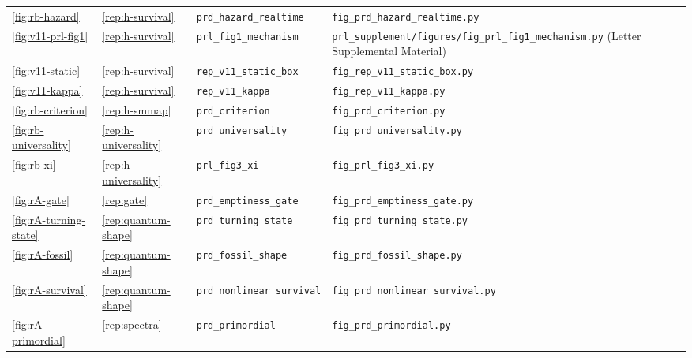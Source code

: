 {\begin{longtable}{@{}>{\raggedright\arraybackslash}p{}>{\raggedright\arraybackslash}p{}>{\raggedright\arraybackslash}p{}>{\raggedright\arraybackslash}p{}@{}}
\ref{fig:rb-hazard} & \ref{rep:h-survival} & \texttt{prd\_\allowbreak{}hazard\_\allowbreak{}realtime} & \texttt{fig\_\allowbreak{}prd\_\allowbreak{}hazard\_\allowbreak{}realtime.py} \\
\ref{fig:v11-prl-fig1} & \ref{rep:h-survival} & \texttt{prl\_\allowbreak{}fig1\_\allowbreak{}mechanism} & \texttt{prl\_\allowbreak{}supplement/\allowbreak{}figures/\allowbreak{}fig\_\allowbreak{}prl\_\allowbreak{}fig1\_\allowbreak{}mechanism.py} (Letter Supplemental Material) \\
\ref{fig:v11-static} & \ref{rep:h-survival} & \texttt{rep\_\allowbreak{}v11\_\allowbreak{}static\_\allowbreak{}box} & \texttt{fig\_\allowbreak{}rep\_\allowbreak{}v11\_\allowbreak{}static\_\allowbreak{}box.py} \\
\ref{fig:v11-kappa} & \ref{rep:h-survival} & \texttt{rep\_\allowbreak{}v11\_\allowbreak{}kappa} & \texttt{fig\_\allowbreak{}rep\_\allowbreak{}v11\_\allowbreak{}kappa.py} \\
\ref{fig:rb-criterion} & \ref{rep:h-smmap} & \texttt{prd\_\allowbreak{}criterion} & \texttt{fig\_\allowbreak{}prd\_\allowbreak{}criterion.py} \\
\ref{fig:rb-universality} & \ref{rep:h-universality} & \texttt{prd\_\allowbreak{}universality} & \texttt{fig\_\allowbreak{}prd\_\allowbreak{}universality.py} \\
\ref{fig:rb-xi} & \ref{rep:h-universality} & \texttt{prl\_\allowbreak{}fig3\_\allowbreak{}xi} & \texttt{fig\_\allowbreak{}prl\_\allowbreak{}fig3\_\allowbreak{}xi.py} \\
\ref{fig:rA-gate} & \ref{rep:gate} & \texttt{prd\_\allowbreak{}emptiness\_\allowbreak{}gate} & \texttt{fig\_\allowbreak{}prd\_\allowbreak{}emptiness\_\allowbreak{}gate.py} \\
\ref{fig:rA-turning-state} & \ref{rep:quantum-shape} & \texttt{prd\_\allowbreak{}turning\_\allowbreak{}state} & \texttt{fig\_\allowbreak{}prd\_\allowbreak{}turning\_\allowbreak{}state.py} \\
\ref{fig:rA-fossil} & \ref{rep:quantum-shape} & \texttt{prd\_\allowbreak{}fossil\_\allowbreak{}shape} & \texttt{fig\_\allowbreak{}prd\_\allowbreak{}fossil\_\allowbreak{}shape.py} \\
\ref{fig:rA-survival} & \ref{rep:quantum-shape} & \texttt{prd\_\allowbreak{}nonlinear\_\allowbreak{}survival} & \texttt{fig\_\allowbreak{}prd\_\allowbreak{}nonlinear\_\allowbreak{}survival.py} \\
\ref{fig:rA-primordial} & \ref{rep:spectra} & \texttt{prd\_\allowbreak{}primordial} & \texttt{fig\_\allowbreak{}prd\_\allowbreak{}primordial.py} \\

\end{longtable}}
